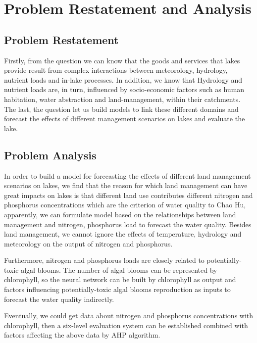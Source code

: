 \documentclass[12pt,a4paper]{article}
\begin{document}
\section{Problem Restatement and Analysis}
\subsection{Problem Restatement}
Firstly, from the question we can know that the goods and services that lakes provide result from complex interactions between meteorology, hydrology, nutrient loads and in-lake processes. In addition, we know that Hydrology and nutrient loads are, in turn, influenced by socio-economic factors such as human habitation, water abstraction and land-management, within their catchments. The last, the question let us build models to link these different domains and forecast the effects of different management scenarios on lakes and evaluate the lake.\par

\subsection{Problem Analysis}
In order to build a model for forecasting the effects of different land management scenarios on lakes, we find that the reason for which land management can have great impacts on lakes is that different land use contributes different nitrogen and phosphorus concentrations which are the criterion of  water quality to Chao Hu, apparently, we can formulate model based on the relationships between land management and nitrogen, phosphorus load to forecast the water quality. Besides land management, we cannot ignore the effects of temperature, hydrology and meteorology on the output of nitrogen and phosphorus.\par
Furthermore, nitrogen and phosphorus loads are closely related to potentially-toxic algal blooms. The number of algal blooms can be represented by chlorophyll, so the neural network can be built by chlorophyll as output and factors influencing potentially-toxic algal blooms reproduction as inputs to forecast the water quality indirectly.\par
Eventually, we could get data about nitrogen and phosphorus concentrations with chlorophyll, then a six-level evaluation system can be established combined with factors affecting the above data by AHP algorithm.\par
\end{document}
